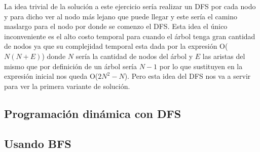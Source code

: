 La idea trivial de la solución a este ejercicio sería realizar un DFS por cada nodo y para dicho ver al nodo más lejano que puede llegar y este sería el camino maslargo para el nodo por donde se comenzo el DFS. Esta idea el único inconveniente es el alto costo temporal para cuando el árbol tenga gran cantidad de nodos ya que su complejidad temporal esta dada por la expresión O($N(N+E)$) donde $N$ sería la cantidad de nodos del árbol y $E$ las aristas del mismo que por definición de un árbol sería $N-1$ por lo que sustituyen en la expresión inicial nos queda O($2N^2-N$). Pero esta idea del DFS nos va a servir para ver la primera variante de solución.

\subsection{Programación dinámica con DFS}


\subsection{Usando BFS}


